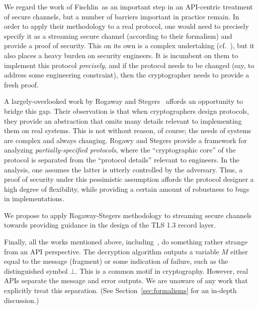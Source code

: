 We regard the work of Fischlin~\etal as an important step in an API-centric
treatment of secure channels, but a number of barriers important in practice
remain.
%
In order to apply their methodology to a real protocol, one would need to
precisely specify it as a streaming secure channel (according to their
formalism) and provide a proof of security. This on its own is a complex
undertaking (cf.~\cite{DLFK+17}), but it also places a heavy burden on security
engineers. It is incumbent on them to implement this protocol \emph{precisely},
and if the protocol needs to be changed (say, to address some engineering
constraint), then the cryptographer needs to provide a fresh proof.

A largely-overlooked work by Rogaway and Stegers~\cite{RS09}
affords an opportunity to bridge this gap. Their observation is that when
cryptographers design protocols, they provide an abstraction that omits many
details relevant to implementing them on real systems.
%
This is not without reason, of course; the needs of systems are complex and always
changing.
%
%
Rogawy and Stegers provide a framework for analyzing \emph{partially-specified
protocols}, where the ``cryptographic core'' of the protocol is separated from
the ``protocol details'' relevant to engineers. In the analysis, one assumes the
latter is utterly controlled by the adversary. Thus, a proof of security under
this pessimistic assumption affords the protocol designer a high degree of
flexibility, while providing a certain amount of robustness to bugs in
implementations.

\begin{task}\label{task:sc}
  We propose to apply Rogaway-Stegers methodology to streaming secure channels
  towards providing guidance in the design of the TLS 1.3 record layer.
\end{task}

\noindent
{}
Finally, all the works mentioned above, including~\cite{FPMG15}, do something
rather strange from an API perspective.
%
The decryption algorithm outputs a variable $M$ either equal to the message
(fragment) or some indication of failure, such as the distinguished symbol
$\bot$. This is a common motif in cryptography. However, real APIs separate the
message and error outputs. We are unaware of any work  that explicitly treat this separation.
%
(See Section~\ref{sec:formalisms} for an in-depth discussion.)

